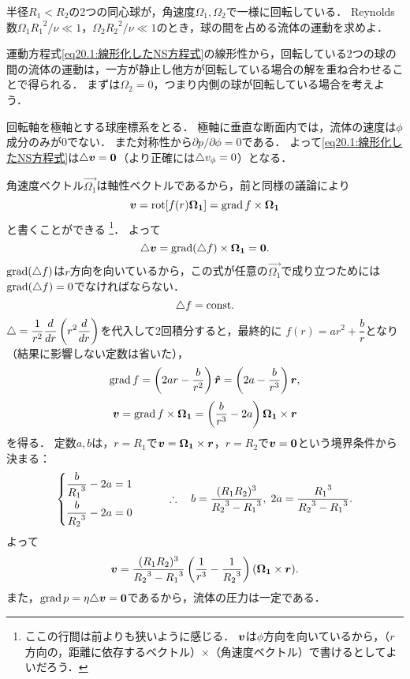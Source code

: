 \begin{mondai}{}{}
半径$R_1<R_2$の2つの同心球が，角速度$\Omega_1, \Omega_2$で一様に回転している．
Reynolds数$\Omega_1{R_1}^2/\nu \ll 1$，$\Omega_2{R_2}^2/\nu \ll 1$のとき，球の間を占める流体の運動を求めよ．
    
\end{mondai}
\begin{kaitou}
運動方程式\eqref{eq20.1:線形化したNS方程式}の線形性から，回転している2つの球の間の流体の運動は，一方が静止し他方が回転している場合の解を重ね合わせることで得られる．
まずは$\Omega_2=0$，つまり内側の球が回転している場合を考えよう．

回転軸を極軸とする球座標系をとる．
極軸に垂直な断面内では，流体の速度は$\phi$成分のみが0でない．
また対称性から$\partial p/\partial\phi=0$である．
よって\eqref{eq20.1:線形化したNS方程式}は$\triangle\vb*{v}=\vb*{0}$（より正確には$\triangle v_\phi=0$）となる．

角速度ベクトル$\vec{\Omega_1}$は軸性ベクトルであるから，前と同様の議論により
\[
    \vb*{v} = \operatorname{rot}[ f(r)\vb*{\Omega_1} ] = \operatorname{grad} f \times \vb*{\Omega_1}
\]
と書くことができる
\footnote{ここの行間は前よりも狭いように感じる．
$\vb*{v}$は$\phi$方向を向いているから，（$r$方向の，距離に依存するベクトル）$\times$（角速度ベクトル）で書けるとしてよいだろう．}．
よって
\[
    \triangle\vb*{v} = \operatorname{grad}( \triangle f) \times \vb*{\Omega_1} = \vb*{0}.
\]
$\operatorname{grad}( \triangle f)$は$r$方向を向いているから，この式が任意の$\vec{\Omega_1}$で成り立つためには$\operatorname{grad}( \triangle f)=0$でなければならない．
\[
    \triangle f = \mathrm{const.}
\]
$\Laplacian = \dfrac{1}{r^2} \ddv{r} \left( r^2 \ddv{r} \right)$を代入して2回積分すると，最終的に
$f(r) = ar^2 + \dfrac{b}{r}$となり（結果に影響しない定数は省いた），
\[
    \operatorname{grad} f = \left( 2ar - \frac{b}{r^2} \right) \vu*{r} = \left( 2a - \frac{b}{r^3} \right) \vb*{r}, 
\]
\[
    \vb*{v} = \operatorname{grad} f \times \vb*{\Omega_1} = \left( \frac{b}{r^3} - 2a \right) \vb*{\Omega_1} \times \vb*{r}
\]
を得る．
定数$a,b$は，$r=R_1$で$\vb*{v}=\vb*{\Omega_1} \times \vb*{r}$，$r=R_2$で$\vb*{v}=\vb*{0}$という境界条件から決まる：
\[
    \begin{cases}
        \dfrac{b}{{R_1}^3} - 2a = 1 \\[8pt] \dfrac{b}{{R_2}^3} - 2a = 0
    \end{cases}
    \qquad\therefore\quad
    b = \frac{(R_1R_2)^3}{{R_2}^3-{R_1}^3}, \;
    2a = \frac{{R_1}^3}{{R_2}^3-{R_1}^3} .
\]
よって
\[
    \vb*{v} = \frac{(R_1R_2)^3}{{R_2}^3-{R_1}^3} \left( \frac{1}{r^3} - \frac{1}{{R_2}^3} \right) (\vb*{\Omega_1} \times \vb*{r}).
\]
また，$\operatorname{grad} p = \eta\triangle\vb*{v} = \vb*{0}$であるから，流体の圧力は一定である．



\end{kaitou}
